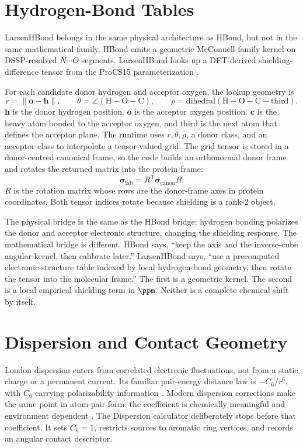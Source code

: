 \documentclass[11pt]{article}
\begin{document}
\section{Hydrogen-Bond Tables}

LarsenHBond belongs in the same physical architecture as HBond, but not in the
same mathematical family. HBond emits a geometric McConnell-family kernel on
DSSP-resolved \(N\cdots O\) segments. LarsenHBond looks up a DFT-derived
shielding-difference tensor from the ProCS15 parameterization \cite{larsen2015}.

For each candidate donor hydrogen and acceptor oxygen, the lookup geometry is
\[
  r=\|\bm o-\bm h\|,
  \qquad
  \theta=\angle(\mathrm H-\mathrm O-\mathrm C),
  \qquad
  \rho=\mathrm{dihedral}(\mathrm H-\mathrm O-\mathrm C-\mathrm{third}).
\]
\(\bm h\) is the donor hydrogen position. \(\bm o\) is the acceptor oxygen
position. \(\bm c\) is the heavy atom bonded to the acceptor oxygen, and
\(\mathrm{third}\) is the next atom that defines the acceptor plane. The runtime
uses \(r,\theta,\rho\), a donor class, and an acceptor class to interpolate a
tensor-valued grid. The grid tensor is stored in a donor-centred canonical
frame, so the code builds an orthonormal donor frame and rotates the returned
matrix into the protein frame:
\[
  \bm\sigma_{\mathrm{lab}}
  =
  R^{\mathsf T}
  \bm\sigma_{\mathrm{canon}}
  R .
\]
\(R\) is the rotation matrix whose rows are the donor-frame axes in protein
coordinates. Both tensor indices rotate because shielding is a rank-2 object.

The physical bridge is the same as the HBond bridge: hydrogen bonding polarizes
the donor and acceptor electronic structure, changing the shielding response.
The mathematical bridge is different. HBond says, ``keep the axis and the
inverse-cube angular kernel, then calibrate later.'' LarsenHBond says, ``use a
precomputed electronic-structure table indexed by local hydrogen-bond geometry,
then rotate the tensor into the molecular frame.'' The first is a geometric
kernel. The second is a local empirical shielding term in \(\si{\ppm}\).
Neither is a complete chemical shift by itself.

\section{Dispersion and Contact Geometry}

London dispersion enters from correlated electronic fluctuations, not from a
static charge or a permanent current. Its familiar pair-energy distance law is
\(-C_6/r^6\), with \(C_6\) carrying polarizability information \cite{london1937}.
Modern dispersion corrections make the same point in atom-pair form: the
coefficient is chemically meaningful and environment dependent
\cite{grimme2010,caldeweyher2019}. The Dispersion calculator deliberately stops
before that coefficient. It sets \(C_6=1\), restricts sources to aromatic ring
vertices, and records an angular contact descriptor.
\end{document}
